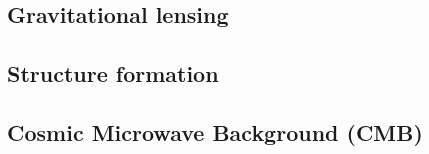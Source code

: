 

\subsection{Gravitational lensing}

\subsection{Structure formation}

\subsection{Cosmic Microwave Background (CMB)}


